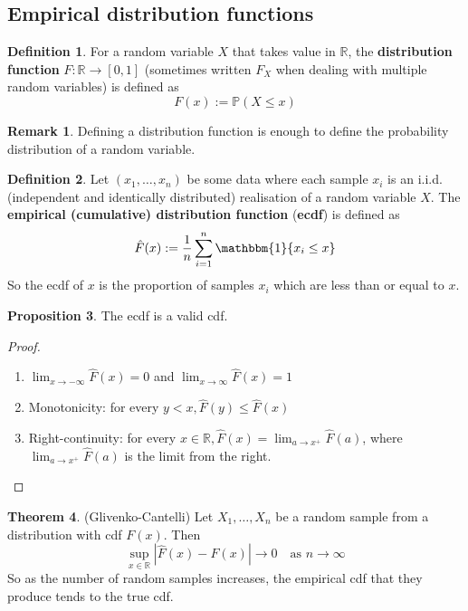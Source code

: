 \documentclass[12pt,a4paper]{article}
\theoremstyle{definition}
\newtheorem{definition}{Definition}[subsection]
\newtheorem{theorem}[definition]{Theorem}
\newtheorem{proposition}[definition]{Proposition}
\newtheorem*{remark}{Remark}
\begin{document}
\subsection{Empirical distribution functions}

\begin{definition}
	For a random variable $X$ that takes value in $\mathbb{R}$, the \textbf{distribution function} $F: \mathbb{R} \rightarrow [0, 1]$ (sometimes written $F_X$ when dealing with multiple random variables) is defined as
	\[
		F(x) := \mathbb{P}(X \le x)
	\]
\end{definition}

\begin{remark}
	Defining a distribution function is enough to define the probability distribution of a random variable.
\end{remark}

\begin{definition}
	Let $(x_1, \dots, x_n)$ be some data where each sample $x_i$ is an i.i.d. (independent and identically distributed) realisation of a random variable $X$. The \textbf{empirical (cumulative) distribution function} (\textbf{ecdf}) is defined as
	\[
		\hat{F}(x) := \frac{1}{n} \sum_{i = 1}^{n} \mathbbm{1} \{ x_i \le x \}
	\]
	So the ecdf of $x$ is the proportion of samples $x_i$ which are less than or equal to $x$.
\end{definition}

\begin{proposition}
	The ecdf is a valid cdf.
\end{proposition}

\begin{proof}
	\hfill
	\begin{enumerate}
		\item $\lim_{x \rightarrow -\infty} \hat{F}(x) = 0$ and $\lim_{x \rightarrow \infty} \hat{F}(x) = 1$
		\item Monotonicity: for every $y < x, \hat{F}(y) \le \hat{F}(x)$
		\item Right-continuity: for every $x \in \mathbb{R}, \hat{F}(x) = \lim_{a \rightarrow x^+}\hat{F}(a)$, where $\lim_{a \rightarrow x^+}\hat{F}(a)$ is the limit from the right.
	\end{enumerate}
\end{proof}

\begin{theorem}
	(Glivenko-Cantelli) Let $X_1, \dots, X_n$ be a random sample from a distribution with cdf $F(x)$. Then
	\[
		\sup_{x \in \mathbb{R}} | \hat{F}(x) - F(x) | \rightarrow 0 \quad \text{as } n \rightarrow \infty
	\]
	So as the number of random samples increases, the empirical cdf that they produce tends to the true cdf.
\end{theorem}
\end{document}
